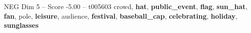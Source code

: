 \begin{textsample}{NEG Dim 5 – Score -5.00 – t005603}  \label{ex:f5_neg_031}
crowd, \textbf{hat}, \textbf{public\_event}, \textbf{flag}, \textbf{sun\_hat}, \textbf{fan}, pole, \textbf{leisure}, audience, \textbf{festival}, \textbf{baseball\_cap}, \textbf{celebrating}, \textbf{holiday}, \textbf{sunglasses}

\end{textsample}
